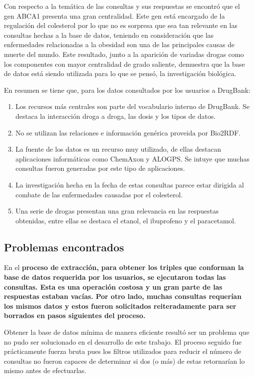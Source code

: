 Con respecto a la temática de las consultas y sus respuestas se encontró que el
gen ABCA1 presenta una gran centralidad. Este gen está encargado de la
regulación del colesterol por lo que no es sorpresa que sea tan relevante en las
consultas hechas a la base de datos, teniendo en consideración que las
enfermedades relacionadas a la obesidad son una de las principales causas de
muerte del mundo.
Este resultado, junto a la aparición de variadas drogas como los componentes con
mayor centralidad de grado saliente, demuestra que la base de datos está siendo
utilizada para lo que se pensó, la investigación biológica.

En resumen se tiene que, para los datos consultados por los usuarios a
DrugBank:
\begin{enumerate}
  \item
    Los recursos más centrales son parte del vocabulario interno de DrugBank.
    Se destaca la interacción droga a droga, las dosis y los tipos de datos.
  \item
    No se utilizan las relaciones e información genérica proveida por Bio2RDF.
  \item
    La fuente de los datos es un recurso muy utilizado, de ellas destacan
    aplicaciones informáticas como ChemAxon  y ALOGPS. Se intuye que muchas
    consultas fueron generadas por este tipo de aplicaciones.
  \item
    La investigación hecha en la fecha de estas consultas parece estar dirigida
    al combate de las enfermedades causadas por el colesterol.
  \item
    Una serie de drogas presentan una gran relevancia en las respuestas
    obtenidas, entre ellas se destaca el etanol, el ibuprofeno y el paracetamol.
\end{enumerate}

\subsection{Problemas encontrados}\label{sec:con:pr}
En el \bf{proceso de extracción}, para obtener los triples que conforman la base
de datos requerida por los usuarios, se ejecutaron todas las consultas.
Esta es una operación costosa y un gran parte de las respuestas estaban vacías.
Por otro lado, muchas consultas requerían los mismos datos y estos fueron
solicitados reiteradamente para ser borrados en pasos siguientes del proceso.

Obtener la base de datos mínima de manera eficiente resultó ser un problema que
no pudo ser solucionado en el desarrollo de este trabajo.
El proceso seguido fue prácticamente fuerza bruta pues los filtros utilizados
para reducir el número de consultas no fueron capaces de determinar si dos (o
más) de estas retornarían lo mismo antes de efectuarlas.

